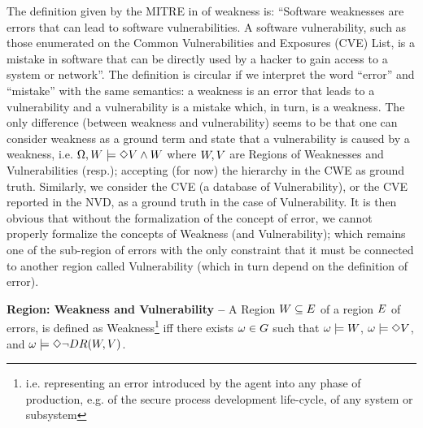 The definition given by the MITRE in\autocite{MITRE2020CWEweakness} of
weakness is: ``Software weaknesses are errors that can lead to software
vulnerabilities. A software vulnerability, such as those enumerated on the
Common Vulnerabilities and Exposures (CVE) List, is a mistake in software that
can be directly used by a hacker to gain access to a system or network''.
The definition is circular if we interpret the word ``error'' and
``mistake'' with the same semantics: a weakness is an error that leads to a
vulnerability and a vulnerability is a mistake which, in turn, is a weakness.
The only difference (between weakness and vulnerability) seems to be
that one can consider weakness as a ground term and state that a
vulnerability is caused by a weakness, i.e. 
$\Omega,W\models\Diamond V\wedge W$ where
$W,V$ are Regions of Weaknesses and Vulnerabilities (resp.);
accepting (for now) the hierarchy in the CWE\autocite{CWE} as ground truth. 
Similarly, we consider the CVE\autocite{CVE} (a database of Vulnerability),
or the CVE reported in the NVD, as a ground truth in the case of Vulnerability. 
It is then obvious that without the formalization of
the concept of error,
we cannot properly formalize the concepts of Weakness (and Vulnerability);
which remains one of the sub-region of errors with the only constraint that it
must be connected to another region called Vulnerability (which in turn depend
on the definition of error).

\begin{definition}{\bf Region: Weakness and Vulnerability --}\label{def:weakness}
	A Region $W\subseteq E$ of a region $E$ of errors,
	is defined as Weakness\footnote{i.e.
	representing an error introduced by the agent into any phase of
	production, e.g.  of the secure process development life-cycle, of any
	system or subsystem} iff there exists $\omega\in G$ such
	that $\omega\models W$, $\omega\models\Diamond V$,
	and $\omega\models\Diamond\neg DR(W,V)$.
\end{definition}

